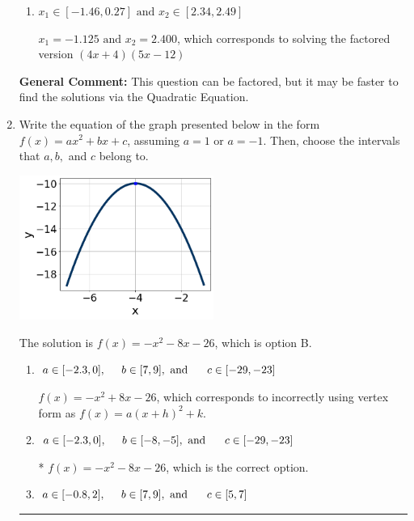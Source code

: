 \documentclass{extbook}[14pt]
\newcommand{\litem}[1]{\item #1

\rule{\textwidth}{0.4pt}}
\begin{document}
\begin{enumerate}
{\begin{enumerate}[label=\Alph*.]
$x_1 = -6.750 \text{ and } x_2 = 0.400$, which corresponds to solving the factored version $(4x + 27)(5x -2)$
\item \( x_1 \in [-1.46, 0.27] \text{ and } x_2 \in [2.34, 2.49] \)

$x_1 = -1.125 \text{ and } x_2 = 2.400$, which corresponds to solving the factored version $(4x + 4)(5x -12)$
\end{enumerate}

\textbf{General Comment:} This question can be factored, but it may be faster to find the solutions via the Quadratic Equation.
}
\litem{
Write the equation of the graph presented below in the form $f(x)=ax^2+bx+c$, assuming  $a=1$ or $a=-1$. Then, choose the intervals that $a, b,$ and $c$ belong to.

\begin{center}
    \includegraphics[width=0.5\textwidth]{../Figures/quadraticGraphToEquationCopyC.png}
\end{center}


The solution is \( f(x) = -x^{2} -8 x -26 \), which is option B.\begin{enumerate}[label=\Alph*.]
\item \( a \in [-2.3, 0], \hspace*{5mm} b \in [7, 9], \text{ and } \hspace*{5mm} c \in [-29, -23] \)

$f(x)=-x^{2} +8 x -26$, which corresponds to incorrectly using vertex form as $f(x) = a(x+h)^2+k$.
\item \( a \in [-2.3, 0], \hspace*{5mm} b \in [-8, -5], \text{ and } \hspace*{5mm} c \in [-29, -23] \)

* $f(x)=-x^{2} -8 x -26$, which is the correct option.
\item \( a \in [-0.8, 2], \hspace*{5mm} b \in [7, 9], \text{ and } \hspace*{5mm} c \in [5, 7] \)


\end{enumerate}}
\end{enumerate}
\end{document}
